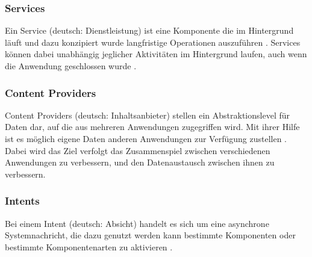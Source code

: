 \subsubsection{Services}
Ein Service (deutsch: \glqq Dienstleistung\grqq ) ist eine Komponente die im Hintergrund läuft und dazu konzipiert wurde langfristige Operationen auszuführen \citep{android:fundamentals}. Services können dabei unabhängig jeglicher Aktivitäten im Hintergrund laufen, auch wenn die Anwendung geschlossen wurde \citep{murphy:beginning-android}.

\subsubsection{Content Providers}
Content Providers (deutsch: \glqq Inhaltsanbieter\grqq ) stellen ein Abstraktionslevel für Daten dar, auf die aus mehreren Anwendungen zugegriffen wird\citep{murphy:beginning-android}. Mit ihrer Hilfe ist es möglich eigene Daten anderen Anwendungen zur Verfügung zustellen \citep{murphy:beginning-android}. \\
Dabei wird das Ziel verfolgt das Zusammenspiel zwischen verschiedenen Anwendungen zu verbessern, und den Datenaustausch zwischen ihnen zu verbessern.

\subsubsection{Intents}
Bei einem Intent (deutsch: \glqq Absicht\grqq ) handelt es sich um eine asynchrone Systemnachricht, die dazu genutzt werden kann bestimmte Komponenten oder bestimmte Komponentenarten zu aktivieren \citep{android:fundamentals}.

